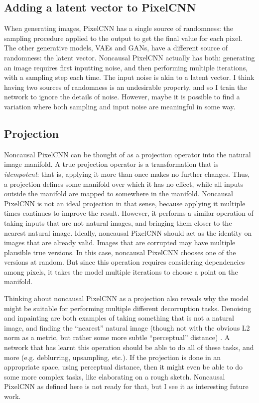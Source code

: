 \documentclass[11pt, a4paper, openany]{book}
\newcommand{\nquote}[1]{``{#1}''}
\begin{document}
\subsection{Adding a latent vector to PixelCNN}

When generating images, PixelCNN has a single source of randomness: the sampling procedure applied to the output to get the final value for each pixel. The other generative models, VAEs and GANs, have a different source of randomness: the latent vector. Noncausal PixelCNN actually has both: generating an image requires first inputting noise, and then performing multiple iterations, with a sampling step each time. The input noise is akin to a latent vector. I think having two sources of randomness is an undesirable property, and so I train the network to ignore the details of noise. However, maybe it is possible to find a variation where both sampling and input noise are meaningful in some way.

\subsection{Projection}

Noncausal PixelCNN can be thought of as a projection operator into the natural image manifold. A true projection operator is a transformation that is \emph{idempotent}: that is, applying it more than once makes no further changes. Thus, a projection defines some manifold over which it has no effect, while all inputs outside the manifold are mapped to somewhere in the manifold. Noncausal PixelCNN is not an ideal projection in that sense, because applying it multiple times continues to improve the result. However, it performs a similar operation of taking inputs that are not natural images, and bringing them closer to the nearest natural image. Ideally, noncausal PixelCNN should act as the identity on images that are already valid. Images that are corrupted may have multiple plausible true versions. In this case, noncausal PixelCNN chooses one of the versions at random. But since this operation requires considering dependencies among pixels, it takes the model multiple iterations to choose a point on the manifold.

Thinking about noncausal PixelCNN as a projection also reveals why the model might be suitable for performing multiple different decorruption tasks. Denoising and inpainting are both examples of taking something that is not a natural image, and finding the \nquote{nearest} natural image (though not with the obvious L2 norm as a metric, but rather some more subtle \nquote{perceptual} distance) \citep{imageinpainting}. A network that has learnt this operation should be able to do all of these tasks, and more (e.g. deblurring, upsampling, etc.). If the projection is done in an appropriate space, using perceptual distance, then it might even be able to do some more complex tasks, like elaborating on a rough sketch. Noncausal PixelCNN as defined here is not ready for that, but I see it as interesting future work.
\end{document}
